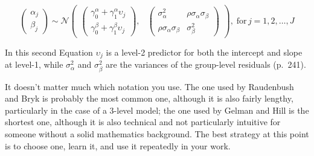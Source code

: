\documentclass[12pt,english]{article}\usepackage[]{graphicx}\usepackage[usenames, dvipsnames]{xcolor}
\begin{document}
\begin{equation}
\begin{pmatrix} 
\alpha_j  \\
\beta_j
\end{pmatrix} \sim \mathcal{N} \begin{pmatrix} 
\begin{pmatrix}  \gamma_0^{\alpha} + \gamma_1^{\alpha}\upsilon_j \\  \gamma_0^{\beta} + \gamma_1^{\beta}\upsilon_j \end{pmatrix},  & \begin{pmatrix} \sigma_{\alpha}^2 & \rho\sigma_{\alpha}\sigma_{\beta} \\ \rho\sigma_{\alpha}\sigma_{\beta} & \sigma_{\beta}^2 \end{pmatrix}
\end{pmatrix},\; \text{for}\, j = 1, 2, \dots, J
\label{eq:eq-13}
\end{equation}

In this second Equation $\upsilon_j$ is a level-2 predictor for both the intercept and slope at level-1, while $\sigma_{\alpha}^2$ and $\sigma_{\beta}^2$ are the variances of the group-level residuals (p.~241).

It doesn't matter much which notation you use. The one used by Raudenbush and Bryk is probably the most common one, although it is also fairly lengthy, particularly in the case of a 3-level model; the one used by Gelman and Hill is the shortest one, although it is also technical and not particularly intuitive for someone without a solid mathematics background. The best strategy at this point is to choose one, learn it, and use it repeatedly in your work.


\end{document}
